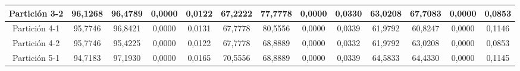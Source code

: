 \documentclass[12pt]{article}
\begin{document}
\begin{table}[H]
{\begin{tabular}{|c|cccc|cccc|cccc|}
Partición 3-2 & \multicolumn{1}{c|}{96,1268}                                                  & \multicolumn{1}{c|}{96,4789}                                                 & \multicolumn{1}{c|}{0,0000}  & 0,0122 & \multicolumn{1}{c|}{67,2222}                                                  & \multicolumn{1}{c|}{77,7778}                                                 & \multicolumn{1}{c|}{0,0000}  & 0,0330 & \multicolumn{1}{c|}{63,0208}                                                  & \multicolumn{1}{c|}{67,7083}                                                 & \multicolumn{1}{c|}{0,0000}  & 0,0853 \\ \hline
Partición 4-1 & \multicolumn{1}{c|}{95,7746}                                                  & \multicolumn{1}{c|}{96,8421}                                                 & \multicolumn{1}{c|}{0,0000}  & 0,0131 & \multicolumn{1}{c|}{67,7778}                                                  & \multicolumn{1}{c|}{80,5556}                                                 & \multicolumn{1}{c|}{0,0000}  & 0,0339 & \multicolumn{1}{c|}{61,9792}                                                  & \multicolumn{1}{c|}{60,8247}                                                 & \multicolumn{1}{c|}{0,0000}  & 0,1146 \\ \hline
Partición 4-2 & \multicolumn{1}{c|}{95,7746}                                                  & \multicolumn{1}{c|}{95,4225}                                                 & \multicolumn{1}{c|}{0,0000}  & 0,0122 & \multicolumn{1}{c|}{67,7778}                                                  & \multicolumn{1}{c|}{68,8889}                                                 & \multicolumn{1}{c|}{0,0000}  & 0,0332 & \multicolumn{1}{c|}{61,9792}                                                  & \multicolumn{1}{c|}{63,0208}                                                 & \multicolumn{1}{c|}{0,0000}  & 0,0853 \\ \hline
Partición 5-1 & \multicolumn{1}{c|}{94,7183}                                                  & \multicolumn{1}{c|}{97,1930}                                                 & \multicolumn{1}{c|}{0,0000}  & 0,0165 & \multicolumn{1}{c|}{70,5556}                                                  & \multicolumn{1}{c|}{68,8889}                                                 & \multicolumn{1}{c|}{0,0000}  & 0,0339 & \multicolumn{1}{c|}{64,5833}                                                  & \multicolumn{1}{c|}{64,4330}                                                 & \multicolumn{1}{c|}{0,0000}  & 0,1145 \\ \hline

\end{tabular}}
\end{table}
\end{document}
